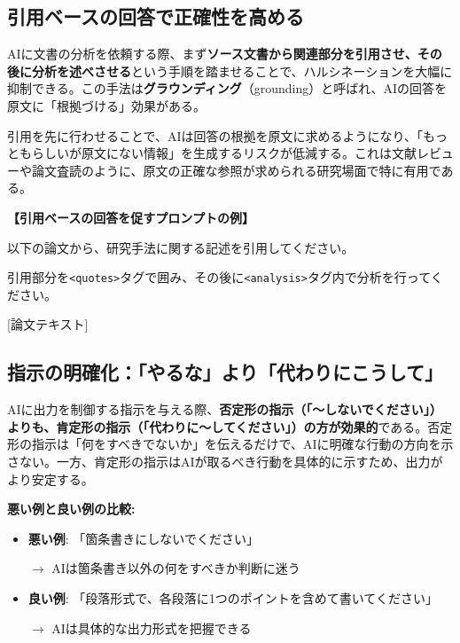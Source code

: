 \subsection{引用ベースの回答で正確性を高める}

AIに文書の分析を依頼する際、まず\textbf{ソース文書から関連部分を引用させ、その後に分析を述べさせる}という手順を踏ませることで、ハルシネーションを大幅に抑制できる。この手法は\textbf{グラウンディング}（grounding）と呼ばれ、AIの回答を原文に「根拠づける」効果がある。

引用を先に行わせることで、AIは回答の根拠を原文に求めるようになり、「もっともらしいが原文にない情報」を生成するリスクが低減する。これは文献レビューや論文査読のように、原文の正確な参照が求められる研究場面で特に有用である。

\begin{promptbox}
\textbf{【引用ベースの回答を促すプロンプトの例】}

以下の論文から、研究手法に関する記述を引用してください。

引用部分を\texttt{<quotes>}タグで囲み、その後に\texttt{<analysis>}タグ内で分析を行ってください。

{[}論文テキスト]
\end{promptbox}

\subsection{指示の明確化：「やるな」より「代わりにこうして」}

AIに出力を制御する指示を与える際、\textbf{否定形の指示（「〜しないでください」）よりも、肯定形の指示（「代わりに〜してください」）の方が効果的}である。否定形の指示は「何をすべきでないか」を伝えるだけで、AIに明確な行動の方向を示さない。一方、肯定形の指示はAIが取るべき行動を具体的に示すため、出力がより安定する。

\vspace{3mm}
\textbf{悪い例と良い例の比較:}
\vspace{2mm}

\begin{itemize}
\item \textbf{悪い例}: 「箇条書きにしないでください」

$\rightarrow$ AIは箇条書き以外の何をすべきか判断に迷う

\item \textbf{良い例}: 「段落形式で、各段落に1つのポイントを含めて書いてください」

$\rightarrow$ AIは具体的な出力形式を把握できる
\end{itemize}

